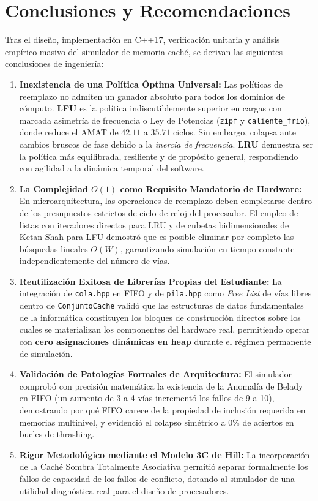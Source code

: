 \documentclass[11pt,letterpaper]{article}
\begin{document}
\newpage
\section{Conclusiones y Recomendaciones}

Tras el diseño, implementación en C++17, verificación unitaria y análisis empírico masivo del simulador de memoria caché, se derivan las siguientes conclusiones de ingeniería:

\begin{enumerate}
    \item \textbf{Inexistencia de una Política Óptima Universal:} Las políticas de reemplazo no admiten un ganador absoluto para todos los dominios de cómputo. \textbf{LFU} es la política indiscutiblemente superior en cargas con marcada asimetría de frecuencia o Ley de Potencias (\texttt{zipf} y \texttt{caliente\_frio}), donde reduce el AMAT de $42.11$ a $35.71$ ciclos. Sin embargo, colapsa ante cambios bruscos de fase debido a la \textit{inercia de frecuencia}. \textbf{LRU} demuestra ser la política más equilibrada, resiliente y de propósito general, respondiendo con agilidad a la dinámica temporal del software.
    \item \textbf{La Complejidad $O(1)$ como Requisito Mandatorio de Hardware:} En microarquitectura, las operaciones de reemplazo deben completarse dentro de los presupuestos estrictos de ciclo de reloj del procesador. El empleo de listas con iteradores directos para LRU y de cubetas bidimensionales de Ketan Shah para LFU demostró que es posible eliminar por completo las búsquedas lineales $O(W)$, garantizando simulación en tiempo constante independientemente del número de vías.
    \item \textbf{Reutilización Exitosa de Librerías Propias del Estudiante:} La integración de \texttt{cola.hpp} en FIFO y de \texttt{pila.hpp} como \textit{Free List} de vías libres dentro de \texttt{ConjuntoCache} validó que las estructuras de datos fundamentales de la informática constituyen los bloques de construcción directos sobre los cuales se materializan los componentes del hardware real, permitiendo operar con \textbf{cero asignaciones dinámicas en heap} durante el régimen permanente de simulación.
    \item \textbf{Validación de Patologías Formales de Arquitectura:} El simulador comprobó con precisión matemática la existencia de la Anomalía de Belady en FIFO (un aumento de 3 a 4 vías incrementó los fallos de 9 a 10), demostrando por qué FIFO carece de la propiedad de inclusión requerida en memorias multinivel, y evidenció el colapso simétrico a $0\%$ de aciertos en bucles de thrashing.
    \item \textbf{Rigor Metodológico mediante el Modelo 3C de Hill:} La incorporación de la Caché Sombra Totalmente Asociativa permitió separar formalmente los fallos de capacidad de los fallos de conflicto, dotando al simulador de una utilidad diagnóstica real para el diseño de procesadores.
\end{enumerate}
\end{document}
